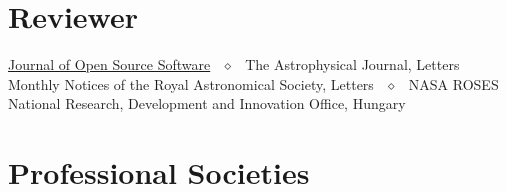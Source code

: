 \documentclass[margin]{res}
\begin{document}
\begin{resume}





\section{Reviewer}

\href{https://github.com/openjournals/joss-reviews/issues?utf8=✓&q=is\%3Aissue+benjaminrose+label\%3Areview}{Journal of Open Source Software} ~$\diamond$~ The Astrophysical Journal, Letters \\ 
Monthly Notices of the Royal Astronomical Society, Letters ~$\diamond$~ NASA ROSES \\
National Research, Development and Innovation Office, Hungary




\section{Professional Societies}


\end{resume}
\end{document}
